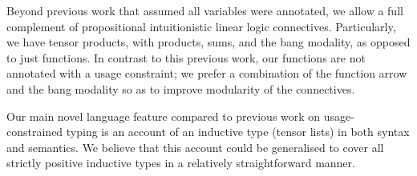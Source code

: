 Beyond previous work that assumed all variables were annotated, we allow a full
complement of propositional intuitionistic linear logic connectives.
Particularly, we have tensor products, with products, sums, and the bang
modality, as opposed to just functions.
In contrast to this previous work, our functions are not annotated with a usage
constraint; we prefer a combination of the function arrow and the bang modality
so as to improve modularity of the connectives.

Our main novel language feature compared to previous work on usage-constrained
typing is an account of an inductive type (tensor lists) in both syntax and
semantics.
We believe that this account could be generalised to cover all strictly positive
inductive types in a relatively straightforward manner.